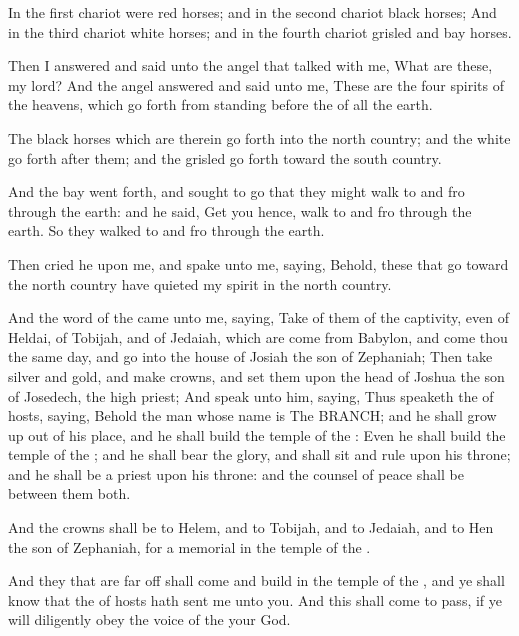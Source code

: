 \verse In the first chariot were red horses; and in the second chariot black horses; \verse And in the third chariot white horses; and in the fourth chariot grisled and bay horses.

\verse Then I answered and said unto the angel that talked with me, What are these, my lord?  \verse And the angel answered and said unto me, These are the four spirits of the heavens, which go forth from standing before the \LORD of all the earth.

\verse The black horses which are therein go forth into the north country; and the white go forth after them; and the grisled go forth toward the south country.

\verse And the bay went forth, and sought to go that they might walk to and fro through the earth: and he said, Get you hence, walk to and fro through the earth. So they walked to and fro through the earth.

\verse Then cried he upon me, and spake unto me, saying, Behold, these that go toward the north country have quieted my spirit in the north country.

\verse And the word of the \LORD came unto me, saying, \verse Take of them of the captivity, even of Heldai, of Tobijah, and of Jedaiah, which are come from Babylon, and come thou the same day, and go into the house of Josiah the son of Zephaniah; \verse Then take silver and gold, and make crowns, and set them upon the head of Joshua the son of Josedech, the high priest; \verse And speak unto him, saying, Thus speaketh the \LORD of hosts, saying, Behold the man whose name is The BRANCH; and he shall grow up out of his place, and he shall build the temple of the \LORD: \verse Even he shall build the temple of the \LORD; and he shall bear the glory, and shall sit and rule upon his throne; and he shall be a priest upon his throne: and the counsel of peace shall be between them both.

\verse And the crowns shall be to Helem, and to Tobijah, and to Jedaiah, and to Hen the son of Zephaniah, for a memorial in the temple of the \LORD.

\verse And they that are far off shall come and build in the temple of the \LORD, and ye shall know that the \LORD of hosts hath sent me unto you. And this shall come to pass, if ye will diligently obey the voice of the \LORD your God.


